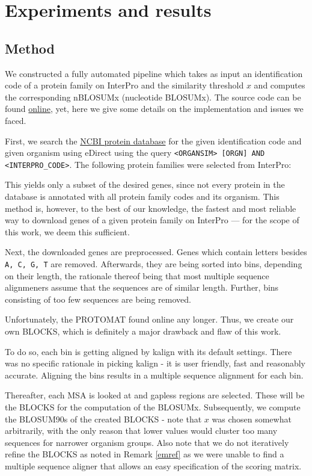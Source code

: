 \documentclass{article}
\begin{document}
\section{Experiments and results}
\subsection{Method}
We constructed a fully automated pipeline which takes as input an identification code of a protein
family on InterPro and the similarity threshold $x$ and computes the
corresponding nBLOSUMx (nucleotide BLOSUMx). The source code can be found \href{https://github.com}{online}, yet, here we
give some details on the implementation and issues we faced.

First, we search the \href{https://www.ncbi.nlm.nih.gov/protein}{NCBI protein
database} for the given identification code and given organism using eDirect
using the query \texttt{<ORGANSIM> [ORGN] AND <INTERPRO\_CODE>}.
The following protein families were selected from InterPro:
 
This yields only a subset of the desired genes, since not every
protein in the database is annotated with all protein family codes and its organism. This method is,
however, to the best of our knowledge, the fastest and most reliable way to
download genes of a given protein family on InterPro --- for the scope of this
work, we deem this sufficient.

Next, the downloaded genes are preprocessed. Genes which contain letters 
besides \texttt{A, C, G, T} are removed. Afterwards, they are being sorted into bins,
depending on their length, the rationale thereof being that most multiple
sequence alignmeners assume that the sequences are of similar length. Further,
bins consisting of too few sequences are being removed.

Unfortunately, the PROTOMAT \cite{henikoffAutomatedAssemblyProtein1991} found online any longer. 
Thus, we create our own BLOCKS, which is definitely a major drawback and flaw of this work. 

To do so, each bin is getting aligned by kalign \cite{lassmannKalignAccurateFast2005} with
its default settings. There was no specific rationale in picking kalign - it is
user friendly, fast and reasonably accurate. Aligning the bins results
in a multiple sequence alignment for each bin.

Thereafter, each MSA is looked at and gapless regions are selected. 
These will be the BLOCKS for the computation of the BLOSUMx.
Subsequently, we compute the BLOSUM90s of the created BLOCKS - note that $x$
was chosen somewhat arbitrarily, with the only reason that lower values would
cluster too many sequences for narrower organism groups. Also note
that we do not iteratively refine the BLOCKS as noted in Remark \ref{emref}
as we were unable to find a multiple sequence aligner that allows an easy specification
of the scoring matrix.
\end{document}
